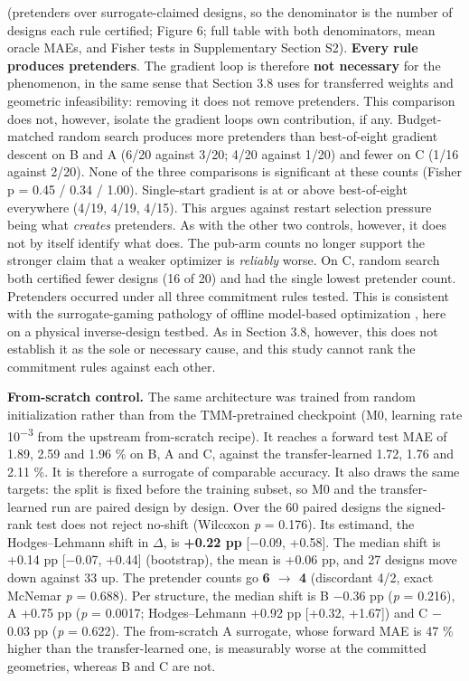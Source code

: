 \documentclass[11pt,a4paper]{article}
\begin{document}
(pretenders over surrogate-claimed designs, so the denominator is the number of
designs each rule certified; Figure 6; full table with both denominators, mean oracle MAEs, and
Fisher tests in Supplementary Section S2). \textbf{Every rule produces pretenders}. The
gradient loop is therefore \textbf{not necessary} for the phenomenon, in the same sense that
Section 3.8 uses for transferred weights and geometric infeasibility: removing it does not
remove pretenders. This comparison does not, however, isolate the gradient loop\textquotesingle s own
contribution, if any. Budget-matched random search produces more pretenders than
best-of-eight gradient descent on B and A (6/20 against 3/20; 4/20 against 1/20) and
fewer on C (1/16 against 2/20). None of the three comparisons is significant at these
counts (Fisher p = 0.45 / 0.34 / 1.00). Single-start gradient is at or above best-of-eight
everywhere (4/19, 4/19, 4/15). This argues against restart selection pressure being what
\emph{creates} pretenders. As with the other two controls, however, it does not by itself
identify what does. The pub-arm counts no longer support the stronger claim that a weaker
optimizer is \emph{reliably} worse. On C, random search both certified fewer designs (16 of 20)
and had the single lowest pretender count. Pretenders occurred under all three commitment
rules tested. This is consistent with the surrogate-gaming pathology of offline
model-based optimization \cite{kumar202013,trabucco202114,trabucco202215,fannjiang202016}, here on a physical inverse-design testbed. As in
Section 3.8, however, this does not establish it as the sole or necessary cause, and this
study cannot rank the commitment rules against each other.

\textbf{From-scratch control.} The same architecture was trained from random initialization
rather than from the TMM-pretrained checkpoint (M0, learning rate 10\textsuperscript{\ensuremath{-}}\textsuperscript{3} from the upstream
from-scratch recipe). It reaches a forward test MAE of 1.89, 2.59 and 1.96 \% on B, A and C,
against the transfer-learned 1.72, 1.76 and 2.11 \%. It is therefore a surrogate of
comparable accuracy. It also draws the same targets: the split is fixed before the
training subset, so M0 and the transfer-learned run are paired design by design. Over the
60 paired designs the signed-rank test does not reject no-shift (Wilcoxon \emph{p} = 0.176).
Its estimand, the Hodges--Lehmann shift in \ensuremath{\Delta}, is \textbf{+0.22 pp} {[}\ensuremath{-}0.09, +0.58{]}. The median
shift is +0.14 pp {[}\ensuremath{-}0.07, +0.44{]} (bootstrap), the mean is +0.06 pp, and 27 designs move
down against 33 up. The pretender counts go \textbf{6 \ensuremath{\rightarrow} 4} (discordant 4/2, exact McNemar
\emph{p} = 0.688). Per structure, the median shift is B \ensuremath{-}0.36 pp (\emph{p} = 0.216), A +0.75 pp
(\emph{p} = 0.0017; Hodges--Lehmann +0.92 pp {[}+0.32, +1.67{]}) and C \ensuremath{-}0.03 pp (\emph{p} = 0.622). The
from-scratch A surrogate, whose forward MAE is 47 \% higher than the transfer-learned one,
is measurably worse at the committed geometries, whereas B and C are not.
\end{document}
